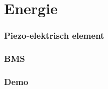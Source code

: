 \section{Energie}
    \begin{frame}
        \frametitle{Piezo-elektrisch element}
    
        
    
    \end{frame}
    \begin{frame}
        \frametitle{BMS}
    
        
    
    \end{frame}
    \begin{frame}
        \frametitle{Demo}
    
        
    
    \end{frame}